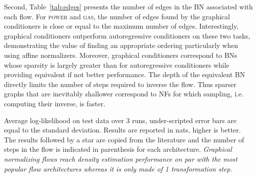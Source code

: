 \documentclass[twoside]{article}
\newcommand{\Cref}[1]{Table~\ref{#1}}
\begin{document}
Second, \Cref{tab:edges} presents the number of edges in the BN associated with each flow. For \textsc{power} and \textsc{gas}, the number of edges found by the graphical conditioners is close or equal to the maximum number of edges. Interestingly, graphical conditioners outperform  autoregressive conditioners on these two tasks, demonstrating the value of finding an appropriate ordering particularly when using affine normalizers. Moreover, graphical conditioners correspond to BNs whose sparsity is largely greater than for autoregressive conditioners while providing equivalent if not better performance. The depth \citep{depth-dag} of the equivalent BN directly limits the number of steps required to inverse the flow. Thus sparser graphs that are inevitably shallower correspond to NFs for which sampling, i.e. computing their inverse, is faster.
\begin{table}
    \caption{Average log-likelihood on test data over 3 runs, under-scripted error bars are equal to the standard deviation. Results are reported in nats, higher is better. The results followed by a star are copied from the literature and the number of steps in the flow is indicated in parenthesis for each architecture. \textit{Graphical normalizing flows reach density estimation performance on par with the most popular flow architectures whereas it is only made of 1 transformation step.}} \label{tab:tabular_density_all}
    \centering
    \scriptsize
    \setlength{\tabcolsep}{0pt}
    \renewcommand{\arraystretch}{1.5}


\end{table}
\end{document}
